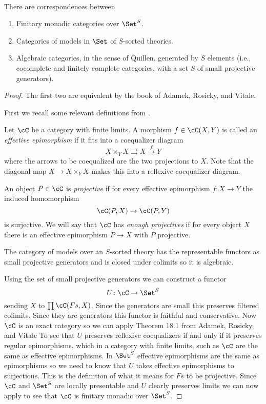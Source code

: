 \documentclass[leqno,oneside,english]{elsarticle}
\newcounter{enumisaved}
\newlength{\thmsaved}
\begin{document}
{{
  {}
  \ifshowsaveblocks
  \ 
  {
\begin{thm*}
  There are correspondences between 
  \begin{enumerate}
    \item Finitary monadic categories over $\Set^S$.
    \item Categories of models in $\Set$ of $S$-sorted theories.
    \item Algebraic categories, in the sense of Quillen, generated by $S$ elements (i.e.,
    cocomplete and finitely complete categories, with a set $S$ of small projective
    generators).
  \end{enumerate}
\end{thm*}
\begin{proof}
  The first two are equivalent by the book of Adamek, Rosicky, and
  Vitale.

First we recall some relevant definitions from
\cite{Qui67}.

Let $\cC$ be a category with finite limits. A morphism $f\in \cC(X,Y)$
is called an \emph{effective epimorphism} if it fits into a coequalizer
diagram 
\[ X\times_{Y}X\rightrightarrows X\xrightarrow{f} Y \] 
where the arrows to be coequalized are the two projections to $X$. 
Note that the diagonal map $X\rightarrow X\times_Y X$ makes this into a
reflexive coequalizer diagram. 

An object $P\in \cC$ is \emph{projective} if for every effective epimorphism
$f\colon X\rightarrow Y$ the induced homomorphism \[ 
\cC(P,X)\rightarrow \cC(P,Y) \] is surjective. We will say that
$\cC$ has \emph{enough projectives} if for every object $X$ there is an
effective epimorphism $P\rightarrow X$ with $P$ projective. 

  The category of models over an $S$-sorted theory has the
  representable functors as small projective generators and is closed
  under colimits so it is algebraic.

  Using the set of small projective generators we can construct a
  functor \[U\colon\cC \rightarrow \Set^S \] sending $X$ to $\prod
  \cC(Fs,X)$. Since the generators are small this preserves filtered
  colimits. Since they are generators this functor is faithful and
  conservative. Now $\cC$ is an exact category so we can apply Theorem 18.1
  from Adamek, Rosicky, and Vitale To see that $U$ preserves reflexive
  coequalizers if and only if it preserves regular epimorphisms, which
  in a category with finite limits, such as $\cC$ are the same as
  effective epimorphisms. In $\Set^S$ effective epimorphisms are the
  same as epimorphisms so we need to know that $U$ takes effective
  epimorphisms to surjections. This is the definition of what it means
  for $Fs$ to be projective. Since $\cC$ and $\Set^S$ are locally
  presentable and $U$ clearly preserves limits we can now apply
   to see that $\cC$
  is finitary monadic over $\Set^S$. 


\end{proof}}}}
\end{document}
